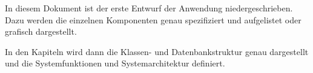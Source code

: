 
In diesem Dokument ist der erste Entwurf der Anwendung niedergeschrieben. Dazu werden die einzelnen Komponenten genau spezifiziert und aufgelistet oder grafisch dargestellt.

In den Kapiteln wird dann die Klassen- und Datenbankstruktur genau dargestellt und die Systemfunktionen und Systemarchitektur definiert.
